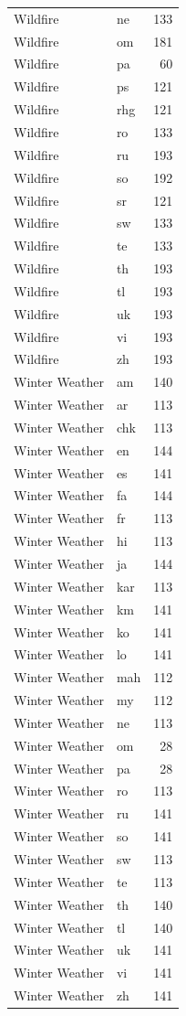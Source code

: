 \begin{longtable}{p{3cm} p{3cm} r}
Wildfire & ne & 133 \\
Wildfire & om & 181 \\
Wildfire & pa & 60 \\
Wildfire & ps & 121 \\
Wildfire & rhg & 121 \\
Wildfire & ro & 133 \\
Wildfire & ru & 193 \\
Wildfire & so & 192 \\
Wildfire & sr & 121 \\
Wildfire & sw & 133 \\
Wildfire & te & 133 \\
Wildfire & th & 193 \\
Wildfire & tl & 193 \\
Wildfire & uk & 193 \\
Wildfire & vi & 193 \\
Wildfire & zh & 193 \\
Winter Weather & am & 140 \\
Winter Weather & ar & 113 \\
Winter Weather & chk & 113 \\
Winter Weather & en & 144 \\
Winter Weather & es & 141 \\
Winter Weather & fa & 144 \\
Winter Weather & fr & 113 \\
Winter Weather & hi & 113 \\
Winter Weather & ja & 144 \\
Winter Weather & kar & 113 \\
Winter Weather & km & 141 \\
Winter Weather & ko & 141 \\
Winter Weather & lo & 141 \\
Winter Weather & mah & 112 \\
Winter Weather & my & 112 \\
Winter Weather & ne & 113 \\
Winter Weather & om & 28 \\
Winter Weather & pa & 28 \\
Winter Weather & ro & 113 \\
Winter Weather & ru & 141 \\
Winter Weather & so & 141 \\
Winter Weather & sw & 113 \\
Winter Weather & te & 113 \\
Winter Weather & th & 140 \\
Winter Weather & tl & 140 \\
Winter Weather & uk & 141 \\
Winter Weather & vi & 141 \\
Winter Weather & zh & 141 \\
\end{longtable}